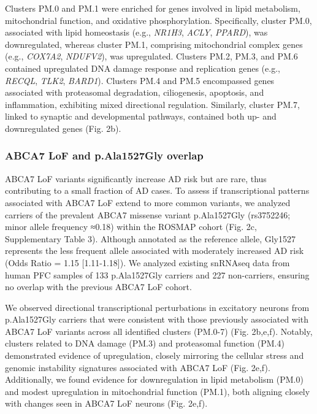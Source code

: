 Clusters PM.0 and PM.1 were enriched for genes involved in lipid metabolism, mitochondrial function, and oxidative phosphorylation. Specifically, cluster PM.0, associated with lipid homeostasis (e.g., \textit{NR1H3}, \textit{ACLY}, \textit{PPARD}), was downregulated, whereas cluster PM.1, comprising mitochondrial complex genes (e.g., \textit{COX7A2}, \textit{NDUFV2}), was upregulated. Clusters PM.2, PM.3, and PM.6 contained upregulated DNA damage response and replication genes (e.g., \textit{RECQL}, \textit{TLK2}, \textit{BARD1}). Clusters PM.4 and PM.5 encompassed genes associated with proteasomal degradation, ciliogenesis, apoptosis, and inflammation, exhibiting mixed directional regulation. Similarly, cluster PM.7, linked to synaptic and developmental pathways, contained both up- and downregulated genes (Fig. 2b).

\subsubsection{ABCA7 LoF and p.Ala1527Gly overlap}
ABCA7 LoF variants significantly increase AD risk but are rare, thus contributing to a small fraction of AD cases\supercite{Steinberg2015-mu,Duchateau2024-rf}. To assess if transcriptional patterns associated with ABCA7 LoF extend to more common variants, we analyzed carriers of the prevalent ABCA7 missense variant p.Ala1527Gly (rs3752246; minor allele frequency ≈0.18) within the ROSMAP cohort (Fig. 2c, Supplementary Table 3). Although annotated as the reference allele, Gly1527 represents the less frequent allele associated with moderately increased AD risk (Odds Ratio = 1.15 [1.11-1.18])\supercite{Kunkle2019-yo,Holstege2022-vp,Naj2011-bs}. We analyzed existing snRNAseq data\supercite{Mathys2023-rs} from human PFC samples of 133 p.Ala1527Gly carriers and 227 non-carriers, ensuring no overlap with the previous ABCA7 LoF cohort.

We observed directional transcriptional perturbations in excitatory neurons from p.Ala1527Gly carriers that were consistent with those previously associated with ABCA7 LoF variants across all identified clusters (PM.0-7) (Fig. 2b,e,f). Notably, clusters related to DNA damage (PM.3) and proteasomal function (PM.4) demonstrated evidence of upregulation, closely mirroring the cellular stress and genomic instability signatures associated with ABCA7 LoF (Fig. 2e,f). Additionally, we found evidence for downregulation in lipid metabolism (PM.0) and modest upregulation in mitochondrial function (PM.1), both aligning closely with changes seen in ABCA7 LoF neurons (Fig. 2e,f).

